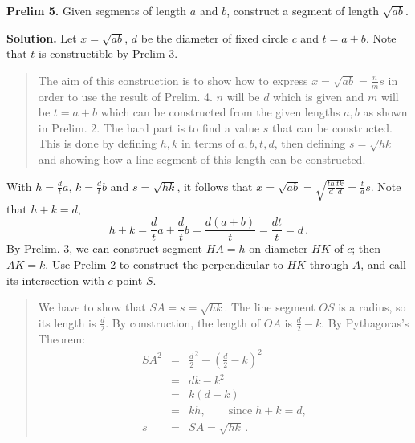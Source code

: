 \documentclass[11pt,a4paper]{article}
\begin{document}
\textbf{Prelim 5.} Given segments of length $a$ and $b$, construct a segment of length $\sqrt{ab}$.

\textbf{Solution.} Let $x=\sqrt{ab}$, $d$ be the diameter of fixed circle $c$ and $t=a+b$. Note that $t$ is constructible by Prelim 3.
\begin{quote}
\vspace*{-8pt}
The aim of this construction is to show how to express $x=\sqrt{ab}=\frac{n}{m}s$ in order to use the result of Prelim. 4. $n$ will be $d$ which is given and $m$ will be $t=a+b$ which can be constructed from the given lengths $a,b$ as shown in Prelim. 2. The hard part is to find a value $s$ that can be constructed. This is done by defining $h,k$ in terms of $a,b,t,d$, then defining $s=\sqrt{hk}$ and showing how a line segment of this length can be constructed.
\vspace*{-8pt}
\end{quote}
With  $h=\frac{d}{t}a$, $k=\frac{d}{t}b$ and $s=\sqrt{hk}$, it follows that $x=\sqrt{ab}=\sqrt{\frac{th}{d}\frac{tk}{d}}=\frac{t}{d}s$. Note that $h+k=d$,
\[
h+k = \frac{d}{t}a + \frac{d}{t}b = \frac{d(a+b)}{t} = \frac{dt}{t} = d\,.
\]
By Prelim. 3, we can construct segment $HA= h$ on diameter $HK$ of $c$; then $AK=k$. Use Prelim 2 to construct the perpendicular to $HK$ through $A$, and call its intersection with $c$ point $S$. 
\begin{center}
\vspace*{-8pt}
\vspace*{-8pt}
\end{center}
\begin{quote}
We have to show that $SA=s=\sqrt{hk}$. The line segment $OS$ is a radius, so its length is $\frac{d}{2}$. By construction, the length of $OA$ is $\frac{d}{2}-k$. By Pythagoras's Theorem:
\[
\renewcommand*{\arraystretch}{1.5}
\begin{array}{rcl}
SA^2 &=& \frac{d}{2}^2 - (\frac{d}{2}-k)^2\\
&=& dk - k^2\\
&=& k(d-k)\\
&=& kh,\quad\quad \textrm{since}\; h+k=d,\\
s&=&SA=\sqrt{hk}\,.
\end{array}
\]
\end{quote}
\end{document}
